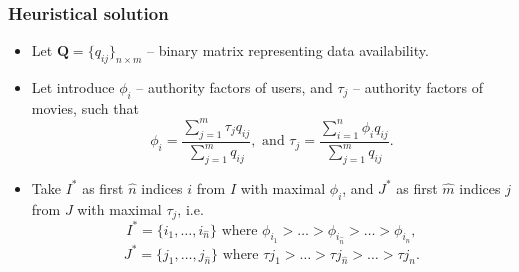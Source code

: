 \documentclass{beamer}
\newcommand{\mQ}{\mathbf{Q}}
\begin{document}
\begin{frame}
\frametitle{Heuristical solution}
\begin{itemize}
  \item Let $\mQ = \{q_{ij}\}_{n \times m}$ -- binary matrix representing data
  availability.
  \item Let introduce $\phi_{i}$ -- authority factors of users, and $\tau_{j}$
  -- authority factors of movies, such that
  \begin{equation*}
\phi_{i}  = \frac{\sum\limits_{j = 1}^m\tau_{j}
  q_{ij}}{\sum\limits_{j=1}^m q_{ij}},
\text{ and }
\tau_{j}  = \frac{\sum\limits_{i = 1}^n\phi_{i} q_{ij}}{\sum\limits_{j=1}^m
q_{ij}}.  
  \end{equation*}
  \item Take $I^*$ as first $\hat{n}$  indices $i$ from $I$ with maximal
  $\phi_i$, and $J^*$ as first $\hat{m}$  indices $j$ from $J$ with maximal
  $\tau_j$, i.e.
  \begin{equation*}
  I^* = \{i_1, \ldots, i_{\hat{n}}\} \text{ where } \phi_{i_1}  > \ldots > \phi_{i_{\hat{n}}} >
 \ldots > \phi_{i_{n}}, 
  \end{equation*}
  \begin{equation*}
  J^* = \{j_1, \ldots, j_{\hat{n}}\} \text{ where } \tau{j_1}  > \ldots >
  \tau{j_{\hat{n}}} > \ldots > \tau{j_{n}}.
  \end{equation*}  
  
\end{itemize}
\end{frame}
\end{document}
